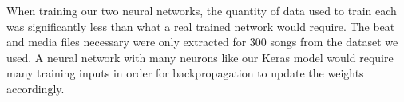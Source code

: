 When training our two neural networks, the quantity of data used to train each was significantly less than what a real trained network would require. The beat and media files necessary were only extracted for 300 songs from the dataset we used. A neural network with many neurons like our Keras model would require many training inputs in order for backpropagation to update the weights accordingly.